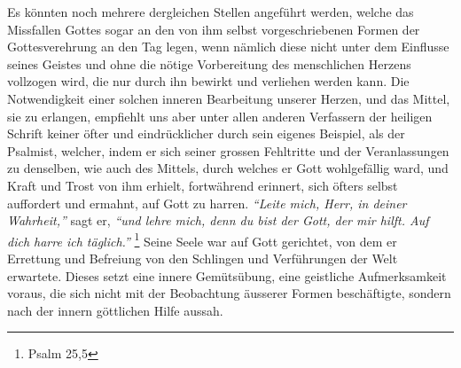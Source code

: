 Es könnten noch mehrere dergleichen Stellen
angeführt werden, welche das
Missfallen Gottes sogar an den von ihm selbst vorgeschriebenen Formen der
Gottesverehrung an den Tag legen, wenn nämlich diese nicht
unter dem Einflusse seines Geistes und ohne die nötige Vorbereitung des
menschlichen Herzens vollzogen wird, die nur durch ihn bewirkt und verliehen
werden kann. Die Notwendigkeit einer solchen inneren Bearbeitung unserer Herzen,
und das Mittel, sie zu erlangen, empfiehlt
uns aber unter allen anderen Verfassern der heiligen Schrift keiner öfter und
eindrücklicher durch sein eigenes Beispiel, als der
Psalmist, welcher, indem
er sich seiner grossen Fehltritte und der Veranlassungen zu denselben, wie auch
des Mittels, durch welches er Gott wohlgefällig ward, und Kraft und Trost von
ihm erhielt, fortwährend erinnert, sich öfters selbst auffordert und ermahnt,
auf Gott zu harren.
\textit{"`Leite mich, Herr, in deiner Wahrheit,"'}  sagt er,
\textit{"`und lehre mich, denn du bist der Gott, der mir hilft. Auf dich harre
ich täglich."'}
\footnote{Psalm 25,5}
Seine Seele war auf Gott gerichtet, von dem er
Errettung und Befreiung von den Schlingen und Verführungen der Welt erwartete.
Dieses setzt eine innere Gemütsübung, eine geistliche Aufmerksamkeit voraus,
die sich nicht mit der Beobachtung äusserer Formen beschäftigte, sondern nach
der innern göttlichen Hilfe aussah.

\medskip

